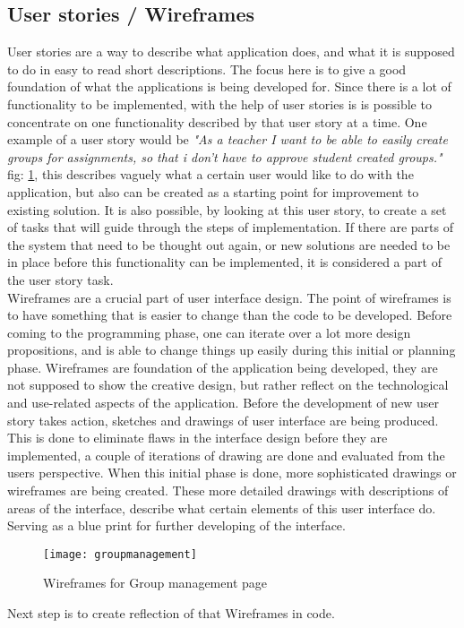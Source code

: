 \subsection{User stories / Wireframes}
User stories are a way to describe what application does, and what it is supposed to do in easy to read short descriptions. The focus here is to give a good foundation of what the applications is being developed for. Since there is a lot of functionality to be implemented, with the help of user stories is is possible to concentrate on one functionality described by that user story at a time. One example of a user story would be \emph{"As a teacher I want to be able to easily create groups for assignments, so that i don't have to approve student created groups."} fig: \ref{fig:groupmanagement}, this describes vaguely what a certain user would like to do with the application, but also can be created as a starting point for improvement to existing solution. It is also possible, by looking at this user story, to create a set of tasks that will guide through the steps of implementation. If there are parts of the system that need to be thought out again, or new solutions are needed to be in place before this functionality can be implemented, it is considered a part of the user story task.
\\Wireframes are a crucial part of user interface design. The point of wireframes is to have something that is easier to change than the code to be developed. Before coming to the programming phase, one can iterate over a lot more design propositions, and is able to change things up easily during this initial or planning phase. Wireframes are foundation of the application being developed, they are not supposed to show the creative design, but rather reflect on the technological and use-related aspects of the application. Before the development of new user story takes action, sketches and drawings of user interface are being produced. This is done to eliminate flaws in the interface design before they are implemented, a couple of iterations of drawing are done and evaluated from the users perspective. When this initial phase is done, more sophisticated drawings or wireframes are being created. These more detailed drawings with descriptions of areas of the interface, describe what certain elements of this user interface do. Serving as a blue print for further developing of the interface.
\begin{figure}[h]
  \centering
  \texttt{[image: groupmanagement]}
  \caption{Wireframes for Group management page }
  \label{fig:groupmanagement}
\end{figure}
Next step is to create reflection of that Wireframes in code.

